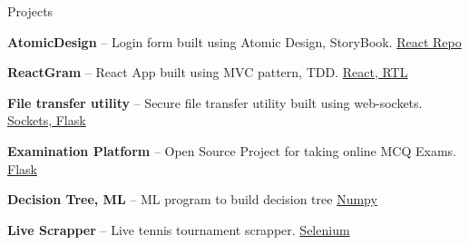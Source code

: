 \documentclass{resume} %
\begin{document}

\begin{rSection}{Projects}
  \begin{rProjectSection}
    \item \textbf {AtomicDesign} -- Login form built using Atomic Design, StoryBook.
    \href{https://github.com/amarkrsinha1997/atomic-design}{React Repo}
    \item \textbf {ReactGram} -- React App built using MVC pattern, TDD.
    \href{https://github.com/amarkrsinha1997/reactgram}{React, RTL}
    \item \textbf {File transfer utility} -- Secure file transfer utility built using web-sockets. \href{https://github.com/amarkrsinha1997/secure-filetransfer}{Sockets, Flask}
    \item \textbf {Examination Platform} -- Open Source Project for taking online MCQ Exams. \href{https://github.com/amarkrsinha1997/MCQ-Testing-Platform}{Flask}
    \item \textbf {Decision Tree, ML} -- ML program to build decision tree \href{https://github.com/amarkrsinha1997/ml-university-exercise}{Numpy}
    \item \textbf {Live Scrapper} -- Live tennis tournament scrapper. \href{https://github.com/amarkrsinha1997/tennis-live-data-scrapper}{Selenium}
  \end{rProjectSection}

\end{rSection}


\end{document}
